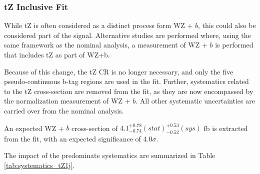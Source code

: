 
\subsubsection{tZ Inclusive Fit}
\label{sec:inc_tZ}

While tZ is often considered as a distinct process form WZ + $b$, this could also be considered part of the signal. Alternative studies are performed where, using the same framework as the nominal analysis, a measurement of WZ + $b$ is performed that includes tZ as part of WZ+b. 

Because of this change, the tZ CR is no longer necessary, and only the five pseudo-continuous b-tag regions are used in the fit. Further, systematics related to the tZ cross-section are removed from the fit, as they are now encompassed by the normalization measurement of WZ + $b$. All other systematic uncertainties are carried over from the nominal analysis.



An expected WZ + $b$ cross-section of $4.1^{+0.78}_{-0.74} (stat)^{+0.53}_{-0.52}(sys)$ fb is extracted from the fit, with an expected significance of 4.0$\sigma$.

The impact of the predominate systematics are summarized in Table \ref{tab:systematics_tZ1j}.


